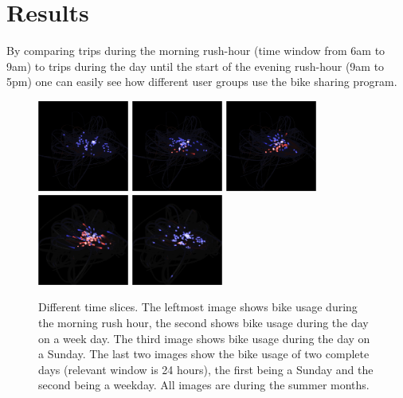 \section{Results}
\label{sec:result}
By comparing trips during the morning rush-hour (time window from
6am to 9am) to trips during the day until the start of
the evening rush-hour (9am to 5pm) one can easily see
how different user groups use the bike sharing program.

\begin{figure}
\centering
\includegraphics[width=3cm]{images/rush_7_tue.png}
\hspace*{0.5cm}
\includegraphics[width=3cm]{images/day_7_fri.png}
\hspace*{0.5cm}
\includegraphics[width=3cm]{images/day_7_sun.png}
\hspace*{0.5cm}
\includegraphics[width=3cm]{images/full_10_sun.png}
\hspace*{0.5cm}
\includegraphics[width=3cm]{images/full_10_wed.png}
\caption{Different time slices. The leftmost image shows
bike usage during the morning rush hour, the second shows
bike usage during the day on a week day. The third image
shows bike usage during the day on a Sunday.
The last two images show the bike usage of two complete
days (relevant window is 24 hours), the first being a Sunday
and the second being a weekday. All images are during the summer months.}
\label{fig:smallm}
\end{figure}

